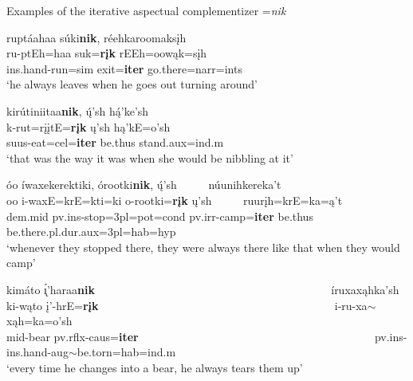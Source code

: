 \begin{exe}

\item\label{nikexamples} Examples of the iterative aspectual complementizer =\textit{nik}

	\begin{xlist}
	
	\item\label{nikexamples1}
	\glll ruptáahaa súki\textbf{nik}, réehkaroomaksįh\\
	ru-ptEh=haa suk=\textbf{rįk} rEEh=oowąk=sįh\\
	ins.hand-\textnormal{run}=sim \textnormal{exit}=\textbf{iter} \textnormal{go.there}=narr=ints\\
	\glt `he always leaves when he goes out turning around' \citep[88]{hollow1973a}

	\item\label{nikexamples2}
	\glll kirútiniitaa\textbf{nik}, ų́'sh hą́'ke'sh\\
	k-rut=rįįtE=\textbf{rįk} ų'sh hą'kE=o'sh\\
	suus-\textnormal{eat}=cel=\textbf{iter} \textnormal{be.thus} \textnormal{stand}.aux=ind.m\\
	\glt `that was the way it was when she would be nibbling at it' \citep[126]{hollow1973a}

	\item\label{nikexamples3}
	\glll óo íwaxekerektiki, órootki\textbf{nik}, ų́'sh ~ ~ ~ núunihkereka't\\
	oo i-waxE=krE=kti=ki o-rootki=\textbf{rįk} ų'sh ~ ~ ~  ruurįh=krE=ka=ą't\\
	dem.mid pv.ins-\textnormal{stop}=3pl=pot=cond pv.irr-\textnormal{camp}=\textbf{iter} \textnormal{be.thus} ~ ~ ~ \textnormal{be.there}.pl.dur.aux=3pl=hab=hyp\\
	\glt `whenever they stopped there, they were always there like that when they would camp' \citep[203]{hollow1973a}

	\item\label{nikexamples4}
	\glll	kimáto \'{ı̨}'haraa\textbf{nik} ~ ~ ~ ~ ~ ~ ~ ~ ~ ~ ~ ~ ~ ~ ~ ~ ~ ~ ~ ~ ~ ~ ~ ~ ~ íruxaxąhka'sh\\
	ki-wąto į'-hrE=\textbf{rįk} ~ ~ ~ ~ ~ ~ ~ ~ ~ ~ ~ ~ ~ ~ ~ ~ ~ ~ ~ ~ ~ ~ ~ ~ ~ i-ru-xa$\sim$xąh=ka=o'sh\\
	mid-\textnormal{bear} pv.rflx-caus=\textbf{iter} ~ ~ ~ ~ ~ ~ ~ ~ ~ ~ ~ ~ ~ ~ ~ ~ ~ ~ ~ ~ ~ ~ ~ ~ ~ pv.ins-ins.hand-aug$\sim$\textnormal{be.torn}=hab=ind.m\\
	\glt `every time he changes into a bear, he always tears them up' \citep[156]{hollow1973b}

	\end{xlist}

\end{exe}

